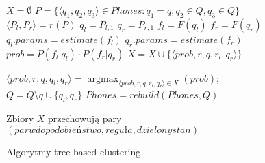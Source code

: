 \documentclass[11pt]{article}
\DeclareMathOperator*{\argmax}{\arg\max}   %
\begin{document}
	\begin{figure}
		\begin{algorithmic}[1]
			
			
				\STATE $X = \emptyset \label{line:iter_begin}$
					\STATE $P = \Big\{\langle q_1, q_2, q_3\rangle \in Phones: q_1 = q, q_2 \in Q, q_3 \in Q\Big\}$
						\STATE $\langle P_l, P_r \rangle = r(P)$			
						\STATE $q_l = P_{l,1}$
						\STATE $q_r = P_{r,1}$
						\STATE $f_l = F(q_l)$ \label{line:f_l}
						\STATE $f_r = F(q_r)$ \label{line:f_r}
							\STATE $q_l.params = estimate(f_l)$
							\STATE $q_r.params = estimate(f_r)$
								\STATE $prob = P(f_l | q_l) \cdot P(f_r | q_r)$
								\STATE $X = X \cup \{\langle prob, r, q, r_l, q_r\rangle\}$ \label{line:r_prob}
							\ENDIF
						\ENDIF
					\ENDFOR
				\ENDFOR \label{line:iter_end}
				
					
					\STATE $\langle prob, r, q, q_l, q_r\rangle = \argmax_{\langle prob, r, q, r_l, q_r\rangle\in X}(prob)$;
					\STATE $Q = Q \setminus {q} \cup \{q_l, q_r\} \label{line:q_ext}$
					\STATE $Phones = rebuild(Phones, Q)\label{line:p_eqt}$
				\ELSE
				\ENDIF
			\ENDWHILE
		\end{algorithmic}
		
		Zbiory $X$ przechowują pary $(parwdopodobieństwo, reguła, dzielony stan)$ 
		
		\caption{Algorytmy tree-based clustering}
		\label{alg:tree_based_clustering}
	\end{figure}
\end{document}
